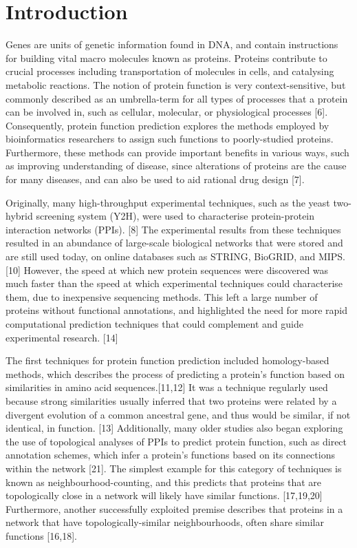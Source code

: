 \documentclass[9pt]{article}
\begin{document}
\section{Introduction}\label{sec:Introduction}
Genes are units of genetic information found in DNA, and contain instructions for building vital macro molecules known as proteins. Proteins contribute to crucial processes including transportation of molecules in cells, and catalysing metabolic reactions. The notion of protein function is very context-sensitive, but commonly described as an umbrella-term for all types of processes that a protein can be involved in, such as cellular, molecular, or physiological processes [6]. Consequently, protein function prediction explores the methods employed by bioinformatics researchers to assign such functions to poorly-studied proteins. Furthermore, these methods can provide important benefits in various ways, such as improving understanding of disease, since alterations of proteins are the cause for many diseases, and can also be used to aid rational drug design [7].
\par
Originally, many high-throughput experimental techniques, such as the yeast two-hybrid screening system (Y2H), were used to characterise protein-protein interaction networks (PPIs). [8] The experimental results from these techniques resulted in an abundance of large-scale biological networks that were stored and are still used today, on online databases such as STRING, BioGRID, and MIPS. [10] However, the speed at which new protein sequences were discovered was much faster than the speed at which experimental techniques could characterise them, due to inexpensive sequencing methods. This left a large number of proteins without functional annotations, and highlighted the need for more rapid computational prediction techniques that could complement and guide experimental research. [14]
\par
The first techniques for protein function prediction included homology-based methods, which describes the process of predicting a protein’s function based on similarities in amino acid sequences.[11,12] It was a technique regularly used because strong similarities usually inferred that two proteins were related by a divergent evolution of a common ancestral gene, and thus would be similar, if not identical, in function. [13] Additionally, many older studies also began exploring the use of topological analyses of PPIs to predict protein function, such as direct annotation schemes, which infer a protein’s functions based on its connections within the network [21]. The simplest example for this category of techniques is known as neighbourhood-counting, and this predicts that proteins that are topologically close in a network will likely have similar functions. [17,19,20] Furthermore, another successfully exploited premise describes that proteins in a network that have topologically-similar neighbourhoods, often share similar functions [16,18]. 
\end{document}
